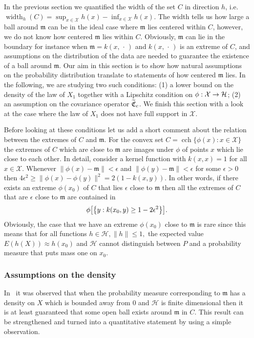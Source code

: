\documentclass[AHL,Unicode,longabstracts,published]{cedram}
\theoremstyle{remark}
\DeclareMathOperator{\cch}{cch}
\DeclareMathOperator{\diam}{width}
\newcommand{\X}{\mathcal{X}}
\newcommand{\cH}{\mathcal{H}}
\newcommand{\fkC}{\mathfrak{C}}
\newcommand{\mean}{\mathfrak{m}}
\let\oldtilde\tilde
\renewcommand*{\tilde}[1]{\mathchoice{\widetilde{#1}}{\widetilde{#1}}{\oldtilde{#1}}{\oldtilde{#1}}}
\renewcommand*{\to}{\mathchoice{\longrightarrow}{\rightarrow}{\rightarrow}{\rightarrow}}
\let\originalleft\left
\let\originalright\right
\renewcommand{\left}{\mathopen{}\mathclose\bgroup\originalleft}
\renewcommand{\right}{\aftergroup\egroup\originalright}
\begin{document}
In the previous section we quantified the width of the set $C$ in direction $h$, i.e. $\diam_h(C) = \sup_{x \in \X} h(x) - \inf_{x\in\X} h(x)$. The width tells us how large a ball around $\mean$ can be in the ideal case where $\mean$ lies centered within $C$, however, we do not know how centered $\mean$ lies within $C$. Obviously, $\mean$ can lie in the boundary for instance when $\mean = k(x,\,\cdot\,)$ and $k(x,\,\cdot\,)$ is an extreme of $C$, and assumptions on the distribution of the data are needed to guarantee the existence of a ball around $\mean$. Our aim in this section is to show how natural assumptions on the probability distribution translate to statements of how centered $\mean$ lies. In the following, we are studying two such conditions: (1) a lower bound on the density of the law of $X_1$ together with a Lipschitz condition on $\phi:\X \to \cH$; (2) an assumption on the covariance operator $\tilde{\fkC}_c$. We finish this section with a look at the case where the law of $X_1$ does not have full support in $\X$.

Before looking at these conditions let us add a short comment about the relation between the extremes of $C$ and $\mean$. For the convex set $C = \cch\{ \phi(x) : x \in \X\}$ the extremes of $C$ which are close to $\mean$ are images under $\phi$ of points $x$ which lie close to each other. In detail, consider a kernel function with $k(x,x) = 1$ for all $x\in \X$. Whenever $\|\phi(x) - \mean\| < \epsilon$ and $\|\phi(y) - \mean \| < \epsilon$ for some $\epsilon > 0$ then $4\epsilon^2 \geq \|\phi(x) - \phi(y)\|^2 = 2(1-k(x,y))$. In other words, if there exists an extreme $\phi(x_0)$ of $C$ that lies $\epsilon$ close to $\mean$ then all the extremes of $C$ that are $\epsilon$ close to $\mean$ are contained in
\[
\phi\left[\left\{y : k(x_0,y) \geq 1- 2 \epsilon^2 \right\}\right].
\]
Obviously, the case that we have an extreme $\phi(x_0)$ close to $\mean$ is rare since this means that for all functions $h \in \cH, \|h\| \leq 1,$ the expected value $E(h(X)) \approx h(x_0)$ and $\cH$ cannot distinguish between $P$ and a probability measure that puts mass one on $x_0$.



\subsubsection{Assumptions on the density} \label{sec:assumption_density}
In~\cite{BACH12} it was observed that when the probability measure corresponding to $\mean$ has a density on $X$ which is bounded away from $0$ and $\cH$ is finite dimensional then it is at least guaranteed that some open ball exists around $\mean$ in $C$. This result can be strengthened and turned into a quantitative statement by using a simple observation.
\end{document}
